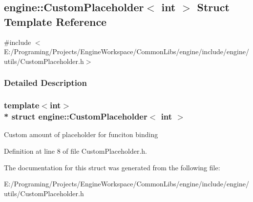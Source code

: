 \hypertarget{a00022}{}\subsection{engine\+:\+:Custom\+Placeholder$<$ int $>$ Struct Template Reference}
\label{a00022}


{\ttfamily \#include $<$E\+:/\+Programing/\+Projects/\+Engine\+Workspace/\+Common\+Libs/engine/include/engine/utils/\+Custom\+Placeholder.\+h$>$}



\subsubsection{Detailed Description}
\subsubsection*{template$<$int$>$\\*
struct engine\+::\+Custom\+Placeholder$<$ int $>$}

Custom amount of placeholder for funciton binding 

Definition at line 8 of file Custom\+Placeholder.\+h.



The documentation for this struct was generated from the following file\+:\begin{DoxyCompactItemize}
\item 
E\+:/\+Programing/\+Projects/\+Engine\+Workspace/\+Common\+Libs/engine/include/engine/utils/Custom\+Placeholder.\+h\end{DoxyCompactItemize}
